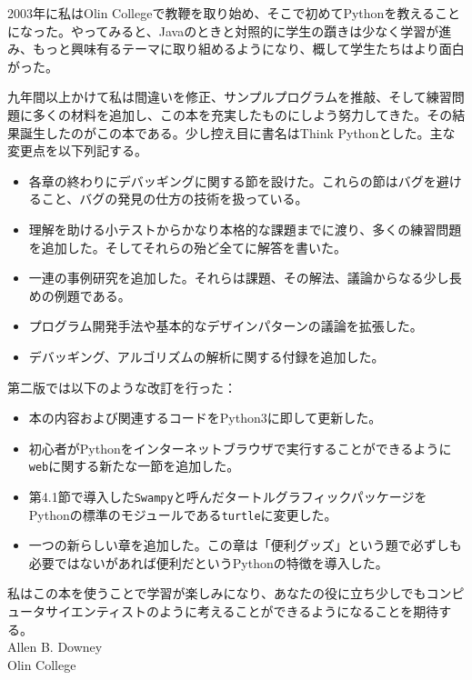 \documentclass[a4j,12pt,makeidx]{jbook}
\begin{document}
2003年に私はOlin Collegeで教鞭を取り始め、そこで初めてPythonを教えることになった。やってみると、Javaのときと対照的に学生の躓きは少なく学習が進み、もっと興味有るテーマに取り組めるようになり、概して学生たちはより面白がった。\par
九年間以上かけて私は間違いを修正、サンプルプログラムを推敲、そして練習問題に多くの材料を追加し、この本を充実したものにしよう努力してきた。その結果誕生したのがこの本である。少し控え目に書名はThink Pythonとした。主な変更点を以下列記する。
\begin{itemize}
\item 各章の終わりにデバッギングに関する節を設けた。これらの節はバグを避けること、バグの発見の仕方の技術を扱っている。
\item 理解を助ける小テストからかなり本格的な課題までに渡り、多くの練習問題を追加した。そしてそれらの殆ど全てに解答を書いた。
\item 一連の事例研究を追加した。それらは課題、その解法、議論からなる少し長めの例題である。 
\item プログラム開発手法や基本的なデザインパターンの議論を拡張した。
\item デバッギング、アルゴリズムの解析に関する付録を追加した。
\end{itemize}
第二版では以下のような改訂を行った：
\begin{itemize}
\item 本の内容および関連するコードをPython3に即して更新した。
\item 初心者がPythonをインターネットブラウザで実行することができるように{\tt web}に関する新たな一節を追加した。
\item 第4.1節で導入した{\tt Swampy}と呼んだタートルグラフィックパッケージをPythonの標準のモジュールである{\tt turtle}に変更した。
\item 一つの新らしい章を追加した。この章は「便利グッズ」という題で必ずしも必要ではないがあれば便利だというPythonの特徴を導入した。
\end{itemize}
私はこの本を使うことで学習が楽しみになり、あなたの役に立ち少しでもコンピュータサイエンティストのように考えることができるようになることを期待する。\\

\noindent
Allen B. Downey \\
Olin College
%
%
\end{document}
